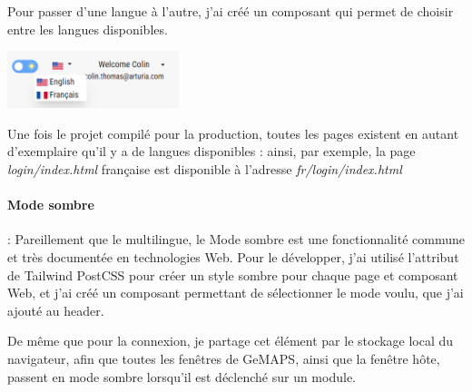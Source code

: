 \documentclass[francais]{rapportPFE}  %
\begin{document}
Pour passer d'une langue à l'autre, j'ai créé un composant qui permet de choisir entre les langues disponibles.

\begin{center}
	\centering
	\includegraphics[width=5cm]{graphics/languages.png}
	\begin{tiny}
	\end{tiny}
	\label{fig}
\end{center} 

Une fois le projet compilé pour la production, toutes les pages existent en autant d'exemplaire qu'il y a de langues disponibles : ainsi, par exemple, la page \textit{login/index.html} française est disponible à l'adresse \textit{fr/login/index.html}

\paragraph{Mode sombre}: Pareillement que le multilingue, le Mode sombre est une fonctionnalité commune et très documentée en technologies Web. Pour le développer, j'ai utilisé l'attribut de Tailwind PostCSS pour créer un style sombre pour chaque page et composant Web, et j'ai créé un composant permettant de sélectionner le mode voulu, que j'ai ajouté au header. 

De même que pour la connexion, je partage cet élément par le stockage local du navigateur, afin que toutes les fenêtres de GeMAPS, ainsi que la fenêtre hôte, passent en mode sombre lorsqu'il est déclenché sur un module.
\end{document}
